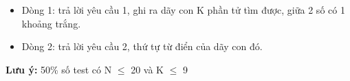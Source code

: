 \begin{itemize}
	\item 

     Dòng 1: trả lời yêu cầu 1, ghi ra dãy con K phần tử tìm được, giữa 2 số có 1 khoảng trắng.    
	\item     Dòng 2: trả lời yêu cầu 2, thứ tự từ điển của dãy con đó.   
\end{itemize}

\textbf{    Lưu ý:   }   50\% số test có N $\le$ 20 và K $\le$ 9  
\begin{itemize}
\end{itemize}